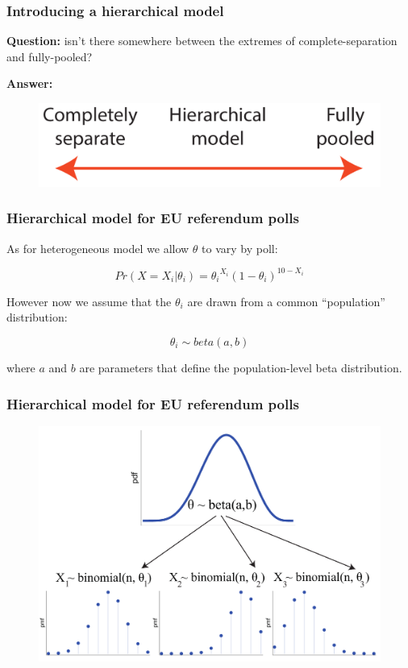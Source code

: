 \documentclass[handout]{beamer}
\begin{document}
\begin{frame}
	\frametitle{Introducing a hierarchical model}
	 \textbf{Question:} isn't there somewhere between the extremes of complete-separation and fully-pooled?
	
	 \textbf{Answer:}
	\onslide<4->
	\begin{figure}[ht]
		\centerline{\includegraphics[width=1\textwidth]{figures/lec6_hierarchicalConcept.pdf}}
	\end{figure}
	
\end{frame}

\begin{frame}
	\frametitle{Hierarchical model for EU referendum polls}
	 As for heterogeneous model we allow $\theta$ to vary by poll:
	
	\begin{equation}
	Pr(X=X_i|\theta_i) = {\theta_i}^{X_i} (1-\theta_i)^{10-X_i}
	\end{equation}
	
	However now we assume that the $\theta_i$ are drawn from a common ``population'' distribution:
	
	\begin{equation}
	\theta_i \sim beta(a,b)
	\end{equation} 
	
	 where $a$ and $b$ are parameters that define the population-level beta distribution.
	
\end{frame}

\begin{frame}
	\frametitle{Hierarchical model for EU referendum polls}
	
	\begin{figure}[ht]
		\centerline{\includegraphics[width=1\textwidth]{figures/lec6_hierarchyConcept.pdf}}
	\end{figure}
	
\end{frame}
\end{document}
